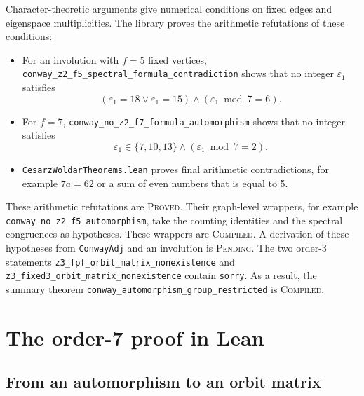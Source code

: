 \documentclass{article}
\theoremstyle{plain}
\theoremstyle{definition}
\numberwithin{equation}{section}
\begin{document}
Character-theoretic arguments give numerical conditions on fixed edges and eigenspace multiplicities. The library proves the arithmetic refutations of these conditions:
\begin{itemize}
 \item For an involution with $f=5$ fixed vertices, \texttt{conway\_z2\_f5\_\allowbreak spectral\_\allowbreak formula\_\allowbreak contradiction} shows that no integer $\varepsilon_1$ satisfies
 \begin{equation}
  (\varepsilon_1 = 18 \lor \varepsilon_1 = 15) \land (\varepsilon_1 \bmod 7 = 6).
  \label{eq:f5_arith}
 \end{equation}
 \item For $f=7$, \texttt{conway\_no\_z2\_f7\_\allowbreak formula\_\allowbreak automorphism} shows that no integer satisfies
 \begin{equation}
  \varepsilon_1 \in \{7, 10, 13\} \land (\varepsilon_1 \bmod 7 = 2).
  \label{eq:f7_arith}
 \end{equation}
 \item \texttt{CesarzWoldarTheorems.lean} proves final arithmetic contradictions, for example $7a = 62$ or a sum of even numbers that is equal to 5.
\end{itemize}
These arithmetic refutations are \textsc{Proved}.
Their graph-level wrappers, for example \texttt{conway\_no\_z2\_f5\_\allowbreak automorphism}, take the counting identities and the spectral congruences as hypotheses. These wrappers are \textsc{Compiled}.
A derivation of these hypotheses from \texttt{ConwayAdj} and an involution is \textsc{Pending}.
The two order-3 statements \texttt{z3\_fpf\_orbit\_matrix\_nonexistence} and \texttt{z3\_fixed3\_orbit\_matrix\_nonexistence} contain \texttt{sorry}.
As a result, the summary theorem \texttt{conway\_automorphism\_\allowbreak group\_\allowbreak restricted} is \textsc{Compiled}.

\section{The order-7 proof in Lean}
\label{sec:z7}

\subsection{From an automorphism to an orbit matrix}
\label{sec:z7_reduction}
\end{document}
